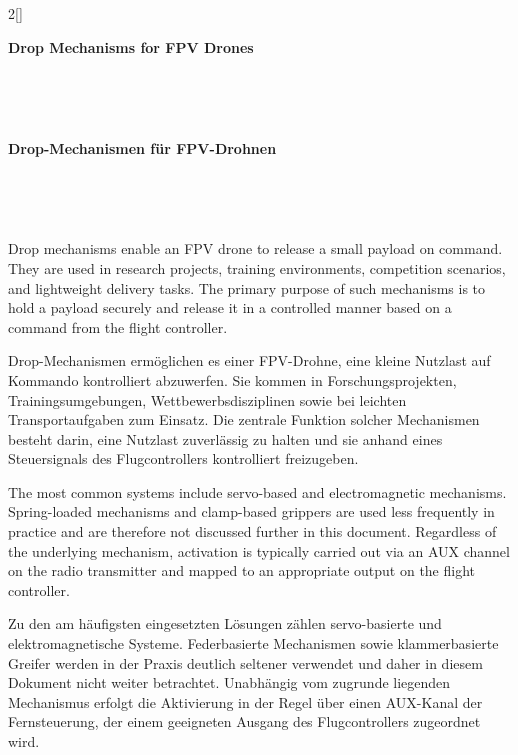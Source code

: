 \renewcommand{\deutschertitel}{Drop-Mechanismen für FPV-Drohnen}
\renewcommand{\englischertitel}{Drop Mechanisms for FPV Drones}
\chapter[\texorpdfstring{\protect{\vspace{2pt}\englischertitel}}{\englischertitel}]{}
\kapitel{\deutschertitel}
\thispagestyle{empty}

\label{KapitelDropMechanismen}

\begin{paracol}{2}[]

{\raggedright\huge\bfseries\sffamily \englischertitel \par\ } \\[1.8ex]

\switchcolumn

{\raggedright\huge\bfseries\sffamily \deutschertitel \par\ } \\[1.8ex]

\coleng

Drop mechanisms enable an FPV drone to release a small payload on command. They are used in research projects, training environments, competition scenarios, and lightweight delivery tasks. The primary purpose of such mechanisms is to hold a payload securely and release it in a controlled manner based on a command from the flight controller. 

\colger

Drop-Mechanismen ermöglichen es einer FPV-Drohne, eine kleine Nutzlast auf Kommando kontrolliert abzuwerfen. Sie kommen in Forschungsprojekten, Trainingsumgebungen, Wettbewerbsdisziplinen sowie bei leichten Transportaufgaben zum Einsatz. Die zentrale Funktion solcher Mechanismen besteht darin, eine Nutzlast zuverlässig zu halten und sie anhand eines Steuersignals des Flugcontrollers kontrolliert freizugeben. 

\coleng

The most common systems include servo-based and electromagnetic mechanisms. Spring-loaded mechanisms and clamp-based grippers are used less frequently in practice and are therefore not discussed further in this document. Regardless of the underlying mechanism, activation is typically carried out via an AUX channel on the radio transmitter and mapped to an appropriate output on the flight controller.

\colger

Zu den am häufigsten eingesetzten Lösungen zählen servo-basierte und elektromagnetische Systeme. Federbasierte Mechanismen sowie klammerbasierte Greifer werden in der Praxis deutlich seltener verwendet und daher in diesem Dokument nicht weiter betrachtet. Unabhängig vom zugrunde liegenden Mechanismus erfolgt die Aktivierung in der Regel über einen AUX-Kanal der Fernsteuerung, der einem geeigneten Ausgang des Flugcontrollers zugeordnet wird.


\end{paracol}
